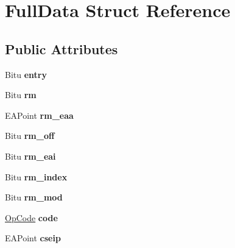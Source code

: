 \hypertarget{structFullData}{\section{Full\-Data Struct Reference}
\label{structFullData}
}
\subsection*{Public Attributes}
\begin{DoxyCompactItemize}
\item 
\hypertarget{structFullData_ae845e6bcb2d15f3da57ab4f1b6b52204}{Bitu {\bfseries entry}}\label{structFullData_ae845e6bcb2d15f3da57ab4f1b6b52204}

\item 
\hypertarget{structFullData_ab68f5d25de81055ff6b4caabab04b542}{Bitu {\bfseries rm}}\label{structFullData_ab68f5d25de81055ff6b4caabab04b542}

\item 
\hypertarget{structFullData_ad2b350d9c74c3d4898c0416f7314a0ad}{E\-A\-Point {\bfseries rm\-\_\-eaa}}\label{structFullData_ad2b350d9c74c3d4898c0416f7314a0ad}

\item 
\hypertarget{structFullData_a69c41c034f318d185e9f87bde3171e59}{Bitu {\bfseries rm\-\_\-off}}\label{structFullData_a69c41c034f318d185e9f87bde3171e59}

\item 
\hypertarget{structFullData_a29d625bc4467f56d1f2ccba8d2e5061d}{Bitu {\bfseries rm\-\_\-eai}}\label{structFullData_a29d625bc4467f56d1f2ccba8d2e5061d}

\item 
\hypertarget{structFullData_a7db0d74b897cbee1196238817a04f027}{Bitu {\bfseries rm\-\_\-index}}\label{structFullData_a7db0d74b897cbee1196238817a04f027}

\item 
\hypertarget{structFullData_a61aa9e11cea8bfd2e43b8f30fe697e07}{Bitu {\bfseries rm\-\_\-mod}}\label{structFullData_a61aa9e11cea8bfd2e43b8f30fe697e07}

\item 
\hypertarget{structFullData_a614d118d26554f400d3db7881b979acf}{\hyperlink{structOpCode}{Op\-Code} {\bfseries code}}\label{structFullData_a614d118d26554f400d3db7881b979acf}

\item 
\hypertarget{structFullData_adfdcabe226cca882391d45f069414b1e}{E\-A\-Point {\bfseries cseip}}\label{structFullData_adfdcabe226cca882391d45f069414b1e}


\end{DoxyCompactItemize}
